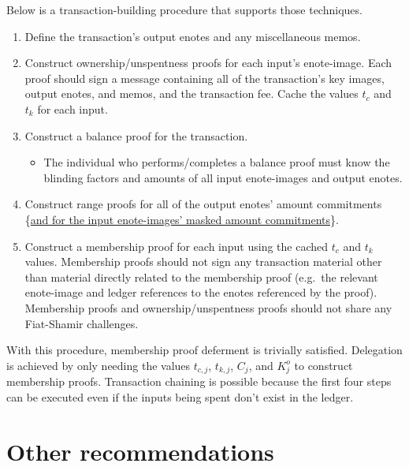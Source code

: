 Below is a transaction-building procedure that supports those techniques.

\begin{enumerate}
    \item Define the transaction's output enotes and any miscellaneous memos.

    \item Construct ownership/unspentness proofs for each input's enote-image. Each proof should sign a message containing all of the transaction's key images, output enotes, and memos, and the transaction fee. Cache the values $t_c$ and $t_k$ for each input.

    \item Construct a balance proof for the transaction.

    \begin{itemize}
        \item The individual who performs/completes a balance proof must know the blinding factors and amounts of all input enote-images and output enotes.
    \end{itemize}

    \item Construct range proofs for all of the output enotes' amount commitments \{\ul{and for the input enote-images' masked amount commitments}\}.

    \item Construct a membership proof for each input using the cached $t_c$ and $t_k$ values. Membership proofs should not sign any transaction material other than material directly related to the membership proof (e.g.\ the relevant enote-image and ledger references to the enotes referenced by the proof). Membership proofs and ownership/unspentness proofs should not share any Fiat-Shamir challenges.
\end{enumerate}

With this procedure, membership proof deferment is trivially satisfied. Delegation is achieved by only needing the values $t_{c,j}$, $t_{k,j}$, $C_j$, and $K^o_j$ to construct membership proofs. Transaction chaining is possible because the first four steps can be executed even if the inputs being spent don't exist in the ledger.



\section{Other recommendations}
\label{sec:other-recommendations}

